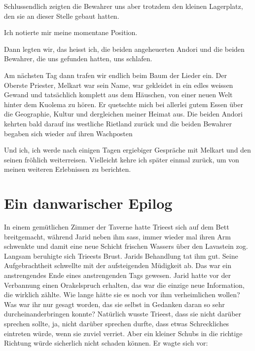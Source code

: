 Schlussendlich zeigten die Bewahrer uns aber trotzdem den kleinen Lagerplatz, den sie an dieser Stelle gebaut hatten.

Ich notierte mir meine momentane Position.



\trennzeichen



Dann legten wir, das heisst ich, die beiden angeheuerten Andori und die beiden Bewahrer, die uns gefunden hatten, uns schlafen.

Am nächsten Tag dann trafen wir endlich beim Baum der Lieder ein. Der Oberste Priester, Melkart war sein Name, war gekleidet in ein edles weissen Gewand und tatsächlich komplett aus dem Häuschen, von einer neuen Welt hinter dem Kuolema zu hören. Er quetschte mich bei allerlei gutem Essen über die Geographie, Kultur und dergleichen meiner Heimat aus. Die beiden Andori kehrten bald darauf ins westliche Rietland zurück und die beiden Bewahrer begaben sich wieder auf ihren Wachposten

Und ich, ich werde nach einigen Tagen ergiebiger Gespräche mit Melkart und den seinen fröhlich weiterreisen. Vielleicht kehre ich später einmal zurück, um von meinen weiteren Erlebnissen zu berichten.




\newpage
\section{Ein danwarischer Epilog}

In einem gemütlichen Zimmer der Taverne hatte Trieest sich auf dem Bett breitgemacht, während Jarid neben ihm sass, immer wieder mal ihren Arm schwenkte und damit eine neue Schicht frischen Wassers über den Lavastein zog. Langsam beruhigte sich Trieests Brust. Jarids Behandlung tat ihm gut. Seine Aufgebrachtheit schwellte mit der aufsteigenden Müdigkeit ab. Das war ein anstrengendes Ende eines anstrengenden Tags gewesen. Jarid hatte vor der Verbannung einen Orakelspruch erhalten, das war die einzige neue Information, die wirklich zählte. Wie lange hätte sie es noch vor ihm verheimlichen wollen? Was war ihr nur gesagt worden, das sie selbst in Gedanken daran so sehr durcheinanderbringen konnte? Natürlich wusste Trieest, dass sie nicht darüber sprechen sollte, ja, nicht darüber sprechen durfte, dass etwas Schreckliches eintreten würde, wenn sie zuviel verriet. Aber ein kleiner Schubs in die richtige Richtung würde sicherlich nicht schaden können. Er wagte sich vor:

